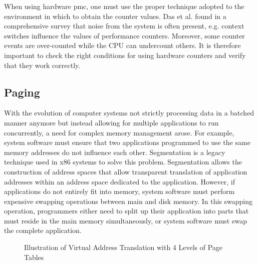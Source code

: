 When using hardware \gls{pmc}, one must use the proper technique adopted to the
environment in which to obtain the counter values. Das et al. found in a
comprehensive survey that noise from the system is often present, e.g. context
switches influence the values of performance counters. \cite{das_sok_2019}
Moreover, some counter events are over-counted while the CPU can undercount
others.\cite{weaver_non-determinism_2013} It is therefore important to check the
right conditions for using hardware counters and verify that they work
correctly.

\subsection{Paging}
\label{sec:state:technical:paging}
With the evolution of computer systems not strictly processing data in a batched
manner anymore but instead allowing for multiple applications to run
concurrently, a need for complex memory management arose. For example, system
software must ensure that two applications programmed to use the same memory
addresses do not influence each other. Segmentation is a legacy technique used
in x86 systems to solve this problem. Segmentation allows the construction of
address spaces that allow transparent translation of application addresses
within an address space dedicated to the application. However, if applications
do not entirely fit into memory, system software must perform expensive swapping
operations between main and disk memory. In this swapping operation, programmers
either need to split up their application into parts that must reside in the
main memory simultaneously, or system software must swap the complete
application.\\

\begin{figure}
  \begin{center}
    
    \caption{Illustration of Virtual Address Translation with 4 Levels of Page Tables}
    \label{fig:state:technical:paging}
  \end{center}
\end{figure}

